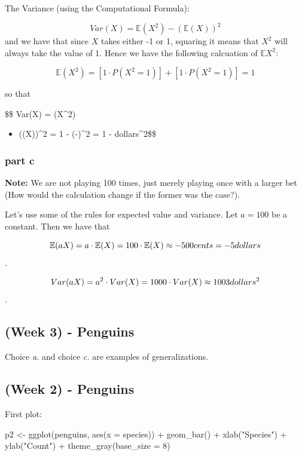 \documentclass[
]{article}
\newenvironment{Shaded}{\begin{snugshade}}{\end{snugshade}}
\newcommand{\AttributeTok}[1]{\textcolor[rgb]{0.77,0.63,0.00}{#1}}
\newcommand{\DecValTok}[1]{\textcolor[rgb]{0.00,0.00,0.81}{#1}}
\newcommand{\FunctionTok}[1]{\textcolor[rgb]{0.00,0.00,0.00}{#1}}
\newcommand{\NormalTok}[1]{#1}
\newcommand{\OtherTok}[1]{\textcolor[rgb]{0.56,0.35,0.01}{#1}}
\newcommand{\SpecialCharTok}[1]{\textcolor[rgb]{0.00,0.00,0.00}{#1}}
\newcommand{\StringTok}[1]{\textcolor[rgb]{0.31,0.60,0.02}{#1}}
\providecommand{\tightlist}{%
  \setlength{\itemsep}{0pt}\setlength{\parskip}{0pt}}
\begin{document}
The Variance (using the Computational Formula):

\[ Var(X) = \mathbb{E}(X^2) - (\mathbb{E}(X))^2 \] and we have that
since \(X\) takes either -1 or 1, squaring it means that \(X^2\) will
always take the value of 1. Hence we have the following calcuation of
\(\mathbb{E}{X^2}\):

\[ \mathbb{E}(X^2) = [1 \cdot P(X^2=1)] + [1 \cdot P(X^2 = 1)] = 1\]

so that

\$\$ Var(X) = (X\^{}2)

\begin{itemize}
\tightlist
\item
  ((X))\^{}2 = 1 - (-)\^{}2 = 1 - 
   \space dollars\^{}2\$\$
\end{itemize}

\hypertarget{part-c-1}{%
\subsubsection{part c}\label{part-c-1}}

\textbf{Note:} We are not playing 100 times, just merely playing once
with a larger bet (How would the calculation change if the former was
the case?).

Let's use some of the rules for expected value and variance. Let
\(a = 100\) be a constant. Then we have that

\[ \mathbb{E}(aX) =  a\cdot \mathbb{E}(X) = 100 \cdot \mathbb{E}(X)
\approx -500 \space cents = -5 \space dollars\].

\[ Var(aX) =  a^2\cdot Var(X) = 1000 \cdot Var(X)
\approx 1003 \space dollars^2\].

\hypertarget{week-3---penguins}{%
\subsection{(Week 3) - Penguins}\label{week-3---penguins}}

Choice \emph{a.} and choice \emph{c.} are examples of generalizations.

\hypertarget{week-2---penguins}{%
\subsection{(Week 2) - Penguins}\label{week-2---penguins}}

First plot:

\begin{Shaded}
\begin{Highlighting}[]
\NormalTok{p2 }\OtherTok{\textless{}{-}} \FunctionTok{ggplot}\NormalTok{(penguins, }
             \FunctionTok{aes}\NormalTok{(}\AttributeTok{x =}\NormalTok{ species)) }\SpecialCharTok{+}
  \FunctionTok{geom\_bar}\NormalTok{() }\SpecialCharTok{+}
  \FunctionTok{xlab}\NormalTok{(}\StringTok{"Species"}\NormalTok{) }\SpecialCharTok{+} \FunctionTok{ylab}\NormalTok{(}\StringTok{"Count"}\NormalTok{) }\SpecialCharTok{+} 
      \FunctionTok{theme\_gray}\NormalTok{(}\AttributeTok{base\_size =} \DecValTok{8}\NormalTok{)}
\end{Highlighting}
\end{Shaded}
\end{document}

